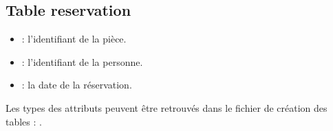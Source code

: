\subsection{Table reservation}
\begin{itemize}
	\item {} : l'identifiant de la pièce.
	\item {} : l'identifiant de la personne.
	\item {} : la date de la réservation.
\end{itemize}

\vspace{30px}
Les types des attributs peuvent être retrouvés dans le fichier de création des tables : .